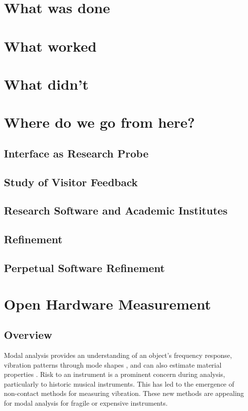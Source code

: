 \section{What was done}\label{what-was-done}

\section{What worked}\label{what-worked}

\section{What didn't}\label{what-didnt}

\section{Where do we go from here?}\label{where-do-we-go-from-here}
\subsection{Interface as Research Probe}
\subsection{Study of Visitor Feedback}
\subsection{Research Software and Academic Institutes}
\subsection{Refinement}
\subsection{Perpetual Software Refinement}


\section{Open Hardware Measurement}\label{where-do-we-go-from-here}

\subsection{Overview}\label{overview}

Modal analysis provides an understanding of an object's frequency response,
vibration patterns through mode shapes \cite{SKRODZKA, MOYNE}, and can also
estimate material properties \cite{DUCCESCHI2024109949}.
Risk to an instrument is a prominent concern during analysis, particularly to
historic musical instruments. This has led to the emergence of non-contact
methods for measuring vibration. These new methods are appealing for modal
analysis for fragile or expensive instruments. 


